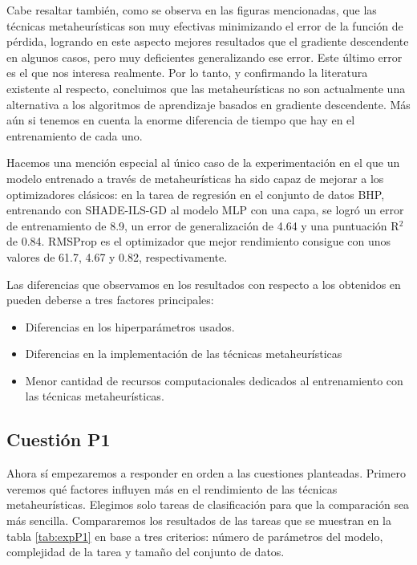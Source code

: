 Cabe resaltar también, como se observa en las figuras mencionadas, que las técnicas metaheurísticas son muy efectivas minimizando el error de la función de pérdida, logrando en este aspecto mejores resultados que el gradiente descendente en algunos casos, pero muy deficientes generalizando ese error. Este último error es el que nos interesa realmente. Por lo tanto, y confirmando la literatura existente al respecto, concluimos que las metaheurísticas no son actualmente una alternativa a los algoritmos de aprendizaje basados en gradiente descendente. Más aún si tenemos en cuenta la enorme diferencia de tiempo que hay en el entrenamiento de cada uno.

Hacemos una mención especial al único caso de la experimentación en el que un modelo entrenado a través de metaheurísticas ha sido capaz de mejorar a los optimizadores clásicos: en la tarea de regresión en el conjunto de datos BHP, entrenando con SHADE-ILS-GD al modelo MLP con una capa, se logró un error de entrenamiento de 8.9, un error de generalización de 4.64 y una puntuación R$^2$ de 0.84. RMSProp es el optimizador que mejor rendimiento consigue con unos valores de 61.7, 4.67 y 0.82, respectivamente.

Las diferencias que observamos en los resultados con respecto a los obtenidos en \cite{MHtrainingClase} pueden deberse a tres factores principales:

\begin{itemize}

\item Diferencias en los hiperparámetros usados.

\item Diferencias en la implementación de las técnicas metaheurísticas

\item Menor cantidad de recursos computacionales dedicados al entrenamiento con las técnicas metaheurísticas.

\end{itemize}

\subsection{Cuestión P1}


Ahora sí empezaremos a responder en orden a las cuestiones planteadas. Primero veremos qué factores influyen más en el rendimiento de las técnicas metaheurísticas. Elegimos solo tareas de clasificación para que la comparación sea más sencilla. Compararemos los resultados de las tareas que se muestran en la tabla \ref{tab:expP1} en base a tres criterios: número de parámetros del modelo, complejidad de la tarea y tamaño del conjunto de datos.

